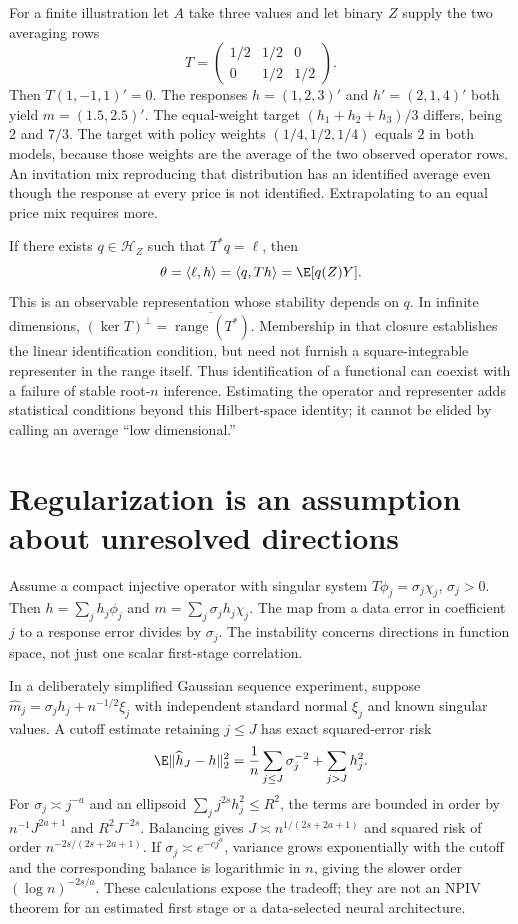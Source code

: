 For a finite illustration let $A$ take three values and let binary $Z$
supply the two averaging rows
\[
 T=\begin{pmatrix}1/2&1/2&0\\0&1/2&1/2\end{pmatrix}.
\]
Then $T(1,-1,1)'=0$. The responses
$h=(1,2,3)'$ and $h'=(2,1,4)'$ both yield $m=(1.5,2.5)'$.
The equal-weight target $(h_1+h_2+h_3)/3$ differs, being $2$ and
$7/3$. The target with policy weights $(1/4,1/2,1/4)$ equals $2$
in both models, because those weights are the average of the two
observed operator rows. An invitation mix reproducing that distribution
has an identified average even though the response at every price is
not identified. Extrapolating to an equal price mix requires more.

If there exists $q\in\mathcal H_Z$ such that $T^*q=\ell$, then
\begin{equation}
 \theta=\langle\ell,h\rangle
       =\langle q,Th\rangle=\E[q(Z)Y].
 \label{r3:adjoint-target}
\end{equation}
This is an observable representation whose stability depends on $q$.
In infinite dimensions,
$(\ker T)^\perp=\overline{\operatorname{range}(T^*)}$.
Membership in that closure establishes the linear identification
condition, but need not furnish a square-integrable representer in the
range itself. Thus identification of a functional can coexist with a
failure of stable root-$n$ inference. Estimating the operator and
representer adds statistical conditions beyond this Hilbert-space
identity; it cannot be elided by calling an average ``low dimensional.''

\section{Regularization is an assumption about unresolved directions}
\label{r3:inverse-rates}
Assume a compact injective operator with singular system
$T\phi_j=\sigma_j\chi_j$, $\sigma_j>0$. Then
$h=\sum_j h_j\phi_j$ and $m=\sum_j\sigma_jh_j\chi_j$.
The map from a data error in coefficient $j$ to a response error divides
by $\sigma_j$. The instability concerns directions in function space,
not just one scalar first-stage correlation.

In a deliberately simplified Gaussian sequence experiment, suppose
$\widehat m_j=\sigma_jh_j+n^{-1/2}\xi_j$ with independent
standard normal $\xi_j$ and known singular values. A cutoff estimate
retaining $j\le J$ has exact squared-error risk
\begin{equation}
 \E\|\widehat h_J-h\|_2^2
 =\frac1n\sum_{j\le J}\sigma_j^{-2}+\sum_{j>J}h_j^2.
 \label{r3:inverse-risk}
\end{equation}
For $\sigma_j\asymp j^{-a}$ and an ellipsoid
$\sum_j j^{2s}h_j^2\le R^2$, the terms are bounded in order by
$n^{-1}J^{2a+1}$ and $R^2J^{-2s}$. Balancing gives
$J\asymp n^{1/(2s+2a+1)}$ and squared risk of order
$n^{-2s/(2s+2a+1)}$. If $\sigma_j\asymp e^{-cj^a}$, variance
grows exponentially with the cutoff and the corresponding balance is
logarithmic in $n$, giving the slower order $(\log n)^{-2s/a}$.
These calculations expose the tradeoff; they are not an NPIV theorem
for an estimated first stage or a data-selected neural architecture.

